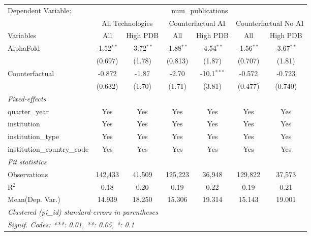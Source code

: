 \begingroup
\centering
\begin{tabular}{lcccccc}
   \tabularnewline \midrule \midrule
   Dependent Variable: & \multicolumn{6}{c}{num\_publications}\\
 & \multicolumn{2}{c}{All Technologies} & \multicolumn{2}{c}{Counterfactual AI} & \multicolumn{2}{c}{Counterfactual No AI} \\
\cmidrule(lr){1-1}\cmidrule(lr){2-3} \cmidrule(lr){4-5} \cmidrule(lr){6-7}
Variables & \multicolumn{1}{c}{All} & \multicolumn{1}{c}{High PDB} & \multicolumn{1}{c}{All} & \multicolumn{1}{c}{High PDB} & \multicolumn{1}{c}{All} & \multicolumn{1}{c}{High PDB} \\
\cmidrule(lr){1-1}\cmidrule(lr){2-2} \cmidrule(lr){3-3} \cmidrule(lr){4-4} \cmidrule(lr){5-5} \cmidrule(lr){6-6} \cmidrule(lr){7-7}
   AlphaFold                    & -1.52$^{**}$ & -3.72$^{**}$ & -1.88$^{**}$ & -4.54$^{**}$  & -1.56$^{**}$ & -3.67$^{**}$\\   
                                & (0.697)      & (1.78)       & (0.813)      & (1.87)        & (0.707)      & (1.81)\\   
   Counterfactual               & -0.872       & -1.87        & -2.70        & -10.1$^{***}$ & -0.572       & -0.723\\   
                                & (0.632)      & (1.70)       & (1.71)       & (3.81)        & (0.477)      & (0.740)\\   
   \midrule
   \emph{Fixed-effects}\\
   quarter\_year                & Yes          & Yes          & Yes          & Yes           & Yes          & Yes\\  
   institution                  & Yes          & Yes          & Yes          & Yes           & Yes          & Yes\\  
   institution\_type            & Yes          & Yes          & Yes          & Yes           & Yes          & Yes\\  
   institution\_country\_code   & Yes          & Yes          & Yes          & Yes           & Yes          & Yes\\  
   \midrule
   \emph{Fit statistics}\\
   Observations                 & 142,433      & 41,509       & 125,223      & 36,948        & 129,822      & 37,573\\  
   R$^2$                        & 0.18         & 0.20         & 0.19         & 0.22          & 0.19         & 0.21\\  
Mean(Dep. Var.) & 14.939 & 18.250 & 15.306 & 19.314 & 15.143 & 19.001 \\
   \midrule \midrule
   \multicolumn{7}{l}{\emph{Clustered (pi\_id) standard-errors in parentheses}}\\
   \multicolumn{7}{l}{\emph{Signif. Codes: ***: 0.01, **: 0.05, *: 0.1}}\\
\end{tabular}
\par\endgroup
